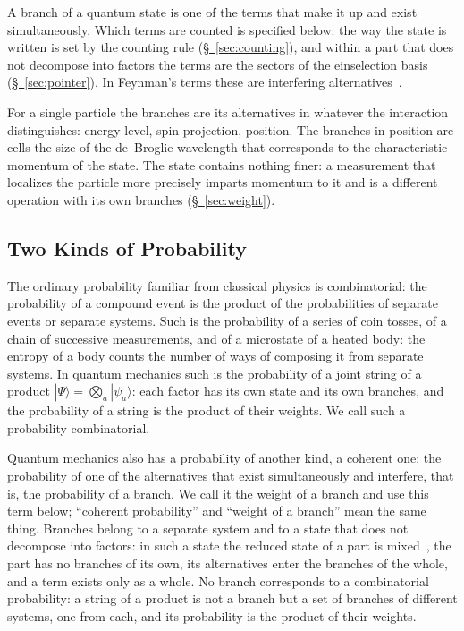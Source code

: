 \documentclass[11pt,a4paper]{article}
\begin{document}
A branch of a quantum state is one of the terms that make it up and exist simultaneously. Which terms are counted is specified below: the way the state is written is set by the counting rule (\hyperref[sec:counting]{\S~\ref*{sec:counting}}), and within a part that does not decompose into factors the terms are the sectors of the einselection basis (\hyperref[sec:pointer]{\S~\ref*{sec:pointer}}). In Feynman's terms these are interfering alternatives~\cite{feynmanhibbs1965}.

For a single particle the branches are its alternatives in whatever the interaction distinguishes: energy level, spin projection, position. The branches in position are cells the size of the de~Broglie wavelength that corresponds to the characteristic momentum of the state. The state contains nothing finer: a measurement that localizes the particle more precisely imparts momentum to it and is a different operation with its own branches (\hyperref[sec:weight]{\S~\ref*{sec:weight}}).

\subsection{Two Kinds of Probability}
\label{sec:two-kinds}

The ordinary probability familiar from classical physics is combinatorial: the probability of a compound event is the product of the probabilities of separate events or separate systems. Such is the probability of a series of coin tosses, of a chain of successive measurements, and of a microstate of a heated body: the entropy of a body counts the number of ways of composing it from separate systems. In quantum mechanics such is the probability of a joint string of a product $|\Psi\rangle=\bigotimes_a|\psi_a\rangle$: each factor has its own state and its own branches, and the probability of a string is the product of their weights. We call such a probability combinatorial.

Quantum mechanics also has a probability of another kind, a coherent one: the probability of one of the alternatives that exist simultaneously and interfere, that is, the probability of a branch. We call it the weight of a branch and use this term below; ``coherent probability'' and ``weight of a branch'' mean the same thing. Branches belong to a separate system and to a state that does not decompose into factors: in such a state the reduced state of a part is mixed~\cite{nielsenchuang2010}, the part has no branches of its own, its alternatives enter the branches of the whole, and a term exists only as a whole. No branch corresponds to a combinatorial probability: a string of a product is not a branch but a set of branches of different systems, one from each, and its probability is the product of their weights.
\end{document}
